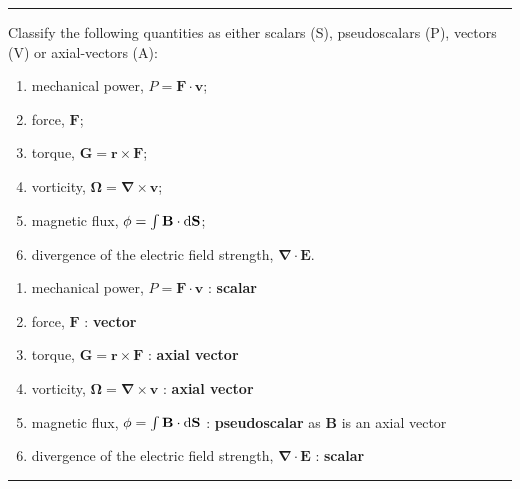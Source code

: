 \noindent\rule{7in}{1.5pt}


\begin{problem}{11.3}
Classify the following quantities as either scalars (S), pseudoscalars (P), vectors (V) or axial-vectors (A):

\begin{enumerate}[label=(\alph*)]
    \item mechanical power, $P=\boldsymbol{F\cdot v}$;
    \item force, $\mathbf{F}$;
    \item torque, $\mathbf{G}=\boldsymbol{r\times F}$;
    \item vorticity, $\boldsymbol{\Omega}=\boldsymbol{\nabla \times v}$;
    \item magnetic flux, $\phi = \int \mathbf{B}\cdot \mathop{}\!\mathrm{d}\mathbf{S}$;
    \item divergence of the electric field strength, $\boldsymbol{\nabla \cdot E}$.
\end{enumerate}
\end{problem}
\begin{solution}
    \begin{enumerate}[label=(\alph*)]
        \item mechanical power, $P=\boldsymbol{F\cdot v}$ : \textbf{scalar}
        \item force, $\mathbf{F}$ : \textbf{vector}
        \item torque, $\mathbf{G}=\boldsymbol{r\times F}$ : \textbf{axial vector}
        \item vorticity, $\boldsymbol{\Omega}=\boldsymbol{\nabla \times v}$ : \textbf{axial vector}
        \item magnetic flux, $\phi = \int \mathbf{B}\cdot \mathop{}\!\mathrm{d}\mathbf{S}$ : \textbf{pseudoscalar} as $\mathbf{B}$ is an axial vector
        \item divergence of the electric field strength, $\boldsymbol{\nabla \cdot E}$ : \textbf{scalar}
    \end{enumerate}
\end{solution}

\noindent\rule{7in}{1.5pt}



